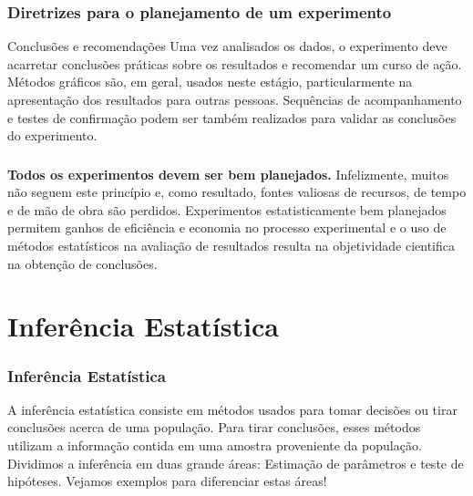 \documentclass[14pt,aspectratio=1610]{beamer}
\begin{document}
\begin{frame}{}
\frametitle{Diretrizes para o planejamento de um experimento}
\begin{block}{Conclusões e recomendações}
\justifying
Uma vez analisados os dados, o experimento deve acarretar conclusões práticas sobre os resultados e recomendar um curso de ação. Métodos gráficos são, em geral, 
usados neste estágio, particularmente na apresentação dos resultados para outras pessoas. Sequências de acompanhamento e testes de confirmação podem ser também 
realizados para validar as conclusões do experimento.
\end{block}
\end{frame}


\begin{frame}{}
\frametitle{}
\begin{block}{}
\justifying
 {\bf Todos os experimentos devem ser bem planejados.} Infelizmente, muitos não seguem este princípio e, como resultado, fontes valiosas de recursos, de tempo e 
de mão de obra são perdidos. Experimentos estatisticamente bem planejados permitem ganhos de eficiência e economia no processo experimental e o uso de métodos 
estatísticos na avaliação de resultados resulta na objetividade cientifica na obtenção de conclusões.
 \end{block}
\end{frame}

\section{Inferência Estatística}
\begin{frame}{}
\frametitle{Inferência Estatística}
\begin{block}{}
\justifying
A inferência estatística consiste em métodos usados para tomar decisões ou tirar 
conclusões acerca de uma população. Para tirar conclusões, esses métodos utilizam a 
informação contida em uma amostra proveniente da população. Dividimos a inferência em 
duas grande áreas: Estimação de parâmetros e teste de hipóteses. Vejamos exemplos 
para diferenciar estas áreas! 
 \end{block}
\end{frame}
\end{document}
